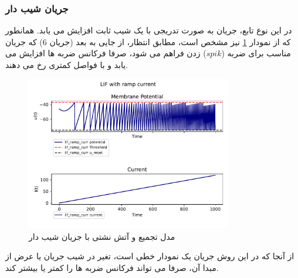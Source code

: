 \documentclass{article}
\begin{document}
            \subsubsection{جریان شیب دار}
                در این نوع تابع، جریان به صورت تدریجی با یک شیب ثابت افزایش می یابد. همانطور که از نمودار
                \ref{fig:lif-ramp-curr}
                نیز مشخص است، مطابق انتظار، از جایی به بعد
                (جریان $6$) 
                که جریان مناسب برای ضربه
                ($spik$) 
                زدن فراهم می شود، صرفا فرکانس ضربه ها افزایش می یابد و با فواصل کمتری رخ می دهند.
                 
                \begin{figure}[H]
                    \centering
                    \includegraphics[width=0.8\textwidth]{plots/LIF with ramp current.pdf} 
                    \caption{مدل تجمیع و آتش نشتی با جریان شیب دار}
                    \label{fig:lif-ramp-curr}
                \end{figure}
                از آنجا که در این روش جریان یک نمودار خطی است، تغیر در شیب جریان یا عرض از مبدا آن، صرفا می تواند فرکانس ضربه ها را کمتر یا بیشتر کند.
\end{document}
